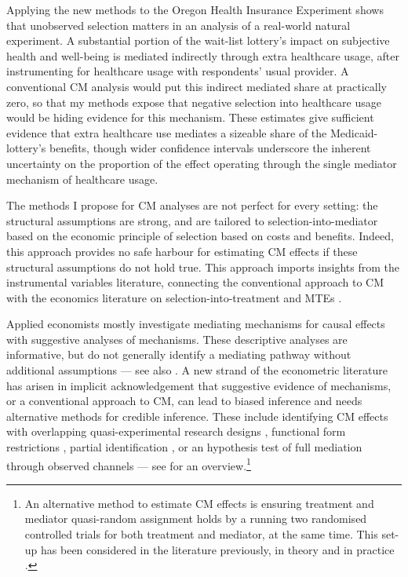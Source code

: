 Applying the new methods to the Oregon Health Insurance Experiment shows that unobserved selection matters in an analysis of a real-world natural experiment.
A substantial portion of the wait-list lottery's impact on subjective health and well-being is mediated indirectly through extra healthcare usage, after instrumenting for healthcare usage with respondents' usual provider.
A conventional CM analysis would put this indirect mediated share at practically zero, so that my methods expose that negative selection into healthcare usage would be hiding evidence for this mechanism.
These estimates give sufficient evidence that extra healthcare use mediates a sizeable share of the Medicaid-lottery's benefits, though wider confidence intervals underscore the inherent uncertainty on the proportion of the effect operating through the single mediator mechanism of healthcare usage.

The methods I propose for CM analyses are not perfect for every setting: the structural assumptions are strong, and are tailored to selection-into-mediator based on the economic principle of selection based on costs and benefits.
Indeed, this approach provides no safe harbour for estimating CM effects if these structural assumptions do not hold true.
This approach imports insights from the instrumental variables literature, connecting the conventional \cite{imai2010identification} approach to CM with the economics literature on selection-into-treatment and MTEs \citep{vytlacil2002independence,heckman2004using,heckman2005structural,florens2008identification,brinch2017beyond,kline2019heckits}.

Applied economists mostly investigate mediating mechanisms for causal effects with suggestive analyses of mechanisms.
These descriptive analyses are informative, but do not generally identify a mediating pathway without additional assumptions --- see also \citet{blackwell2024assumption,green2010enough}.
A new strand of the econometric literature has arisen in implicit acknowledgement that suggestive evidence of mechanisms, or a conventional approach to CM, can lead to biased inference and needs alternative methods for credible inference.
These include identifying CM effects with overlapping quasi-experimental research designs \citep{deuchert2019direct,frolich2017direct}, functional form restrictions \citep{heckman2015econometric,heckman2013understanding}, partial identification \citep{flores2009identification}, or an hypothesis test of full mediation through observed channels \citep{kwon2024testing} --- see \cite{huber2019review} for an overview.\footnote{
    An alternative method to estimate CM effects is ensuring treatment and mediator quasi-random assignment holds by a running two randomised controlled trials for both treatment and mediator, at the same time.
    This set-up has been considered in the literature previously, in theory \citep{imai2013experimental} and in practice \citep{ludwig2011mechanism}.
}

